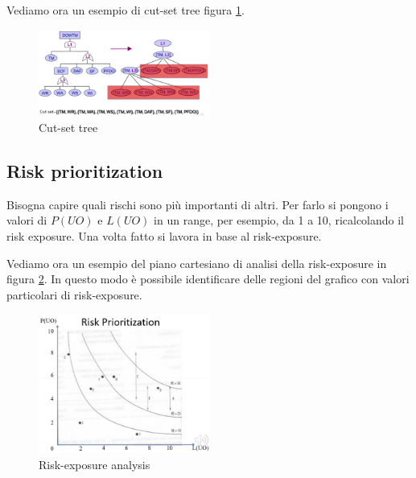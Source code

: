 \begin{esempio}
    Vediamo ora un esempio di cut-set tree figura \ref{fig:cut-set-tree}.
    \begin{figure}[!ht]
        \centering
        \includegraphics[width=0.5\textwidth]{img/risk/cut-set_tree.png}
        \caption{Cut-set tree}
        \label{fig:cut-set-tree}
    \end{figure}
\end{esempio}

\subsection{Risk prioritization}
Bisogna capire quali rischi sono più importanti di altri. Per farlo si pongono i
valori di $P(UO)$ e $L(UO)$ in un range, per esempio, da 1 a 10, ricalcolando il
risk exposure. Una volta fatto si lavora in base al risk-exposure.

\begin{esempio}
    Vediamo ora un esempio del piano cartesiano di analisi della risk-exposure in
    figura \ref{fig:risk-exposure-analysis}. In questo modo è possibile identificare
    delle regioni del grafico con valori particolari di risk-exposure.
    \begin{figure}[!ht]
        \centering
        \includegraphics[width=0.5\textwidth]{img/risk/risk-prioritization.png}
        \caption{Risk-exposure analysis}
        \label{fig:risk-exposure-analysis}
    \end{figure}
\end{esempio}

